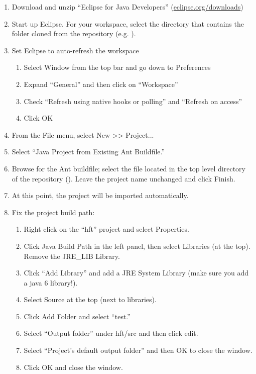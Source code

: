 \documentclass[11pt]{article}
\begin{document}
\begin{enumerate}
\item Download and unzip ``Eclipse for Java Developers'' (\href{http://www.eclipse.org/downloads/}{eclipse.org/downloads})
\item Start up Eclipse. For your workspace, select the directory that contains
  the  folder cloned from the repository (e.g. ).
\item Set Eclipse to auto-refresh the workspace
  \begin{enumerate}
  \item Select Window from the top bar and go down to Preferences
  \item Expand ``General'' and then click on ``Workspace''
  \item Check ``Refresh using native hooks or polling'' and ``Refresh on access''
  \item Click OK
  \end{enumerate}
  
\item From the File menu, select New >> Project...
\item Select ``Java Project from Existing Ant Buildfile.''
\item Browse for the Ant buildfile; select the  file located in
  the top level directory of the repository
  (). Leave the project name unchanged and
  click Finish.
\item At this point, the project will be imported automatically.
\item Fix the project build path:
  \begin{enumerate}
  \item Right click on the ``hft'' project and select Properties.
  \item Click Java Build Path in the left panel, then select Libraries (at the
    top). Remove the JRE\_LIB Library.
  \item Click ``Add Library'' and add a JRE System Library (make sure you add a
    java 6 library!).
  \item Select Source at the top (next to libraries).
  \item Click Add Folder and select ``test.''
  \item Select ``Output folder'' under hft/src and then click edit.
  \item Select ``Project's default output folder'' and then OK to close the window.
  \item Click OK and close the window.
  \end{enumerate}


\end{enumerate}
\end{document}
